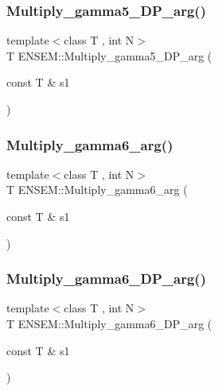 \mbox{\label{namespaceENSEM_a90a385ec1dc402e6976dbbd79cdb8cc7}} 
\subsubsection{\texorpdfstring{Multiply\_gamma5\_DP\_arg()}{Multiply\_gamma5\_DP\_arg()}}
{\footnotesize\ttfamily template$<$class T , int N$>$ \\
T E\+N\+S\+E\+M\+::\+Multiply\+\_\+gamma5\+\_\+\+D\+P\+\_\+arg (\begin{DoxyParamCaption}\item[{const T \&}]{s1 }\end{DoxyParamCaption})\hspace{0.3cm}{\ttfamily [inline]}}

\mbox{\label{namespaceENSEM_adbf26a395689fc53e7ec3c67b7512160}} 
\subsubsection{\texorpdfstring{Multiply\_gamma6\_arg()}{Multiply\_gamma6\_arg()}}
{\footnotesize\ttfamily template$<$class T , int N$>$ \\
T E\+N\+S\+E\+M\+::\+Multiply\+\_\+gamma6\+\_\+arg (\begin{DoxyParamCaption}\item[{const T \&}]{s1 }\end{DoxyParamCaption})\hspace{0.3cm}{\ttfamily [inline]}}

\mbox{\label{namespaceENSEM_ac67ae153a00fc0bed76abd99e4673dd1}} 
\subsubsection{\texorpdfstring{Multiply\_gamma6\_DP\_arg()}{Multiply\_gamma6\_DP\_arg()}}
{\footnotesize\ttfamily template$<$class T , int N$>$ \\
T E\+N\+S\+E\+M\+::\+Multiply\+\_\+gamma6\+\_\+\+D\+P\+\_\+arg (\begin{DoxyParamCaption}\item[{const T \&}]{s1 }\end{DoxyParamCaption})\hspace{0.3cm}{\ttfamily [inline]}}


